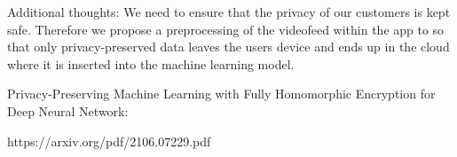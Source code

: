 


Additional thoughts:
We need to ensure that the privacy of our customers is kept safe. Therefore we propose a preprocessing of the videofeed within the app to so that only privacy-preserved data leaves the users device and ends up in the cloud where it is inserted into the machine learning model.

Privacy-Preserving Machine Learning with Fully Homomorphic Encryption for Deep Neural Network:

https://arxiv.org/pdf/2106.07229.pdf
